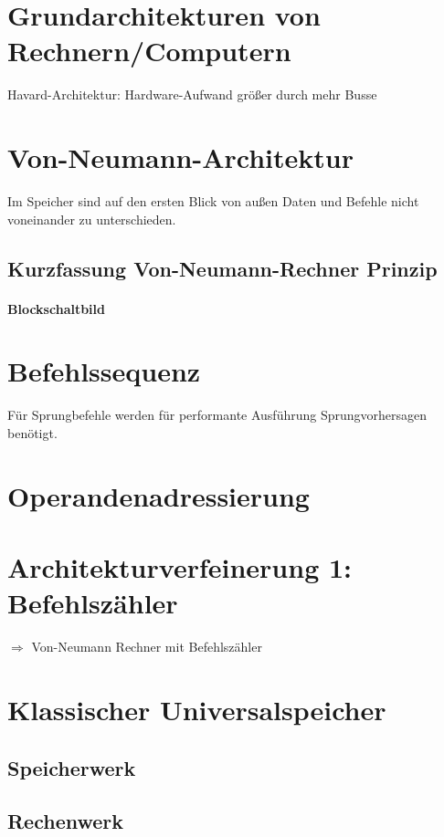 \section{Grundarchitekturen von Rechnern/Computern}
Havard-Architektur: Hardware-Aufwand größer durch mehr Busse

\section{Von-Neumann-Architektur}
Im Speicher sind auf den ersten Blick von außen Daten und Befehle nicht voneinander zu unterschieden.

\subsection{Kurzfassung Von-Neumann-Rechner Prinzip}
\paragraph{Blockschaltbild}

\section{Befehlssequenz}
Für Sprungbefehle werden für performante Ausführung Sprungvorhersagen benötigt.

\section{Operandenadressierung}

\section{Architekturverfeinerung 1: Befehlszähler}
$\Rightarrow$ Von-Neumann Rechner mit Befehlszähler

\section{Klassischer Universalspeicher}
\subsection{Speicherwerk}
\subsection{Rechenwerk}
